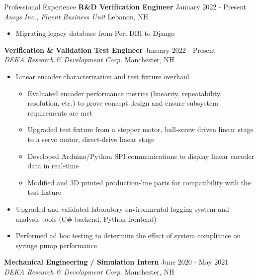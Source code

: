 \documentclass{resume}
\begin{document}
\begin{rSection}{Professional Experience}
    {\bf R\&D Verification Engineer} \hfill {January 2022 - Present}
    \\{\em Ansys Inc., Fluent Business Unit} \hfill {Lebanon, NH}
    \vspace{-0.5em}
    \begin{itemize}[label={\tiny\raisebox{1ex}{\textbullet}}, noitemsep]
        \item Migrating legacy database from Perl DBI to Django
    \end{itemize}
    \vspace{-0.4em}
    {\bf Verification \& Validation Test Engineer} \hfill {January 2022 - Present}
    \\{\em DEKA Research \& Development Corp.} \hfill {Manchester, NH}
    \vspace{-0.5em}
    \begin{itemize}[label={\tiny\raisebox{1ex}{\textbullet}}, noitemsep]
        \item Linear encoder characterization and test fixture overhaul
        \begin{itemize}[label={\tiny\raisebox{1ex}{\textbullet}}, noitemsep]
            \item Evaluated encoder performance metrics (linearity, repeatability, resolution, etc.) to prove concept design and ensure subsystem requirements are met
            \item Upgraded test fixture from a stepper motor, ball-screw driven linear stage to a servo motor, direct-drive linear stage
            \item Developed Arduino/Python SPI communications to display linear encoder data in real-time
            \item Modified and 3D printed production-line parts for compatibility with the test fixture
        \end{itemize}
        \item Upgraded and validated laboratory environmental logging system and analysis tools (C# backend, Python frontend)
        \item Performed ad hoc testing to determine the effect of system compliance on syringe pump performance
    \end{itemize}
    \vspace{-0.4em}
    {\bf Mechanical Engineering / Simulation Intern} \hfill {June 2020 - May 2021}
    \\ {\em DEKA Research \& Development Corp.} \hfill {Manchester, NH}

\end{rSection}
\end{document}
